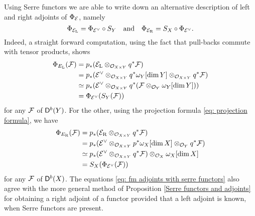 \begin{remark}
    \label{another description of adjoints of FM}
    Using Serre functors we are able to write down an alternative description of left and right adjoints of $\Phi_{\mathcal E}$, namely
    \begin{equation}
        \label{eq: fm adjoints with serre functors}
        \Phi_{\mathcal E_\mathrm{L}} = \Phi_{\mathcal E^\vee} \circ S_Y \quad \text{and} \quad 
        \Phi_{\mathcal E_\mathrm{R}} = S_X \circ \Phi_{\mathcal E^\vee}.
    \end{equation}
    Indeed, a straight forward computation, using the fact that pull-backs commute with tensor products, shows
    \begin{align*}
        \Phi_{E_\mathrm{L}}(\mathcal F) &= p_*(\mathcal E_\mathrm{L} \otimes_{{\mathcal{O}_{X \times Y}}} q^*\mathcal F) \\
        &= p_*(\mathcal E^\vee \otimes_{{\mathcal{O}_{X \times Y}}} q^*\omega_Y[\dim Y] \otimes_{{\mathcal{O}_{X \times Y}}} q^*\mathcal F) \\
        &\simeq p_*(\mathcal E^\vee \otimes_{{\mathcal{O}_{X \times Y}}} q^*(\mathcal F \otimes_{{\mathcal{O}_{Y}}} \omega_Y[\dim Y])) \\
        &= \Phi_{\mathcal E^\vee}(S_Y(\mathcal F))
    \end{align*}
    for any $\mathcal F$ of $\mathsf{D}^b(Y)$. For the other, using the projection formula \eqref{eq: projection formula}, we have
    \begin{align*}
        \Phi_{E_\mathrm{R}}(\mathcal F) &= p_*(\mathcal E_\mathrm{R} \otimes_{{\mathcal{O}_{X \times Y}}} q^*\mathcal F) \\
        &= p_*(\mathcal E^\vee \otimes_{{\mathcal{O}_{X \times Y}}} p^*\omega_X[\dim X] \otimes_{{\mathcal{O}_{Y}}} q^*\mathcal F) \\
        & \simeq p_*(\mathcal E^\vee \otimes_{{\mathcal{O}_{X \times Y}}} q^*\mathcal F) \otimes_{\mathcal{O}_{X}} \omega_X[\dim X] \\
        &= S_X(\Phi_{\mathcal E^\vee}(\mathcal F))
    \end{align*}
    for any $\mathcal F$ of $\mathsf{D}^b(X)$. The equations \eqref{eq: fm adjoints with serre functors} also agree with the more general method of Proposition \ref{Serre functors and adjoints} for obtaining a right adjoint of a functor provided that a left adjoint is known, when Serre functors are present.
\end{remark}

